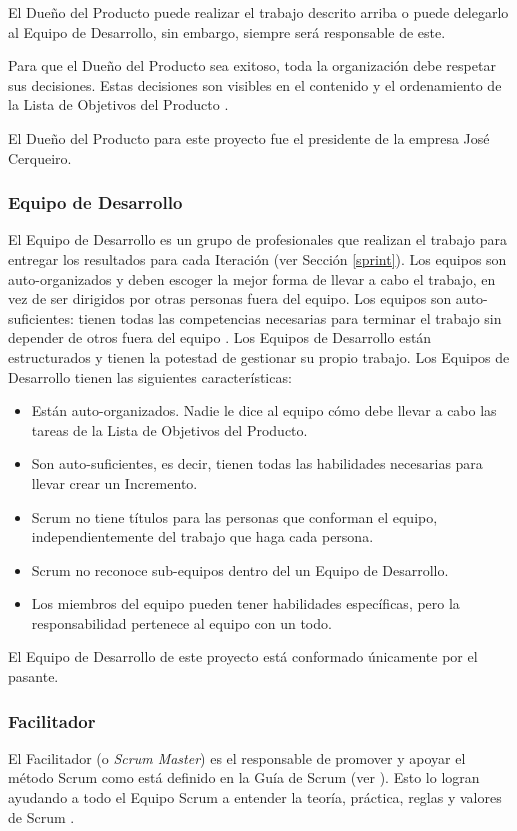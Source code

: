 El Dueño del Producto puede realizar el trabajo descrito arriba o puede delegarlo al Equipo de Desarrollo, sin embargo, siempre será responsable de este.

Para que el Dueño del Producto sea exitoso, toda la organización debe respetar sus decisiones. Estas decisiones son visibles en el contenido y el ordenamiento de la Lista de Objetivos del Producto \cite{scrumSchwaber}.

El Dueño del Producto para este proyecto fue el presidente de la empresa José Cerqueiro.

\subsubsection{Equipo de Desarrollo} \label{developmentTeam}
El Equipo de Desarrollo es un grupo de profesionales que realizan el trabajo para entregar los resultados para cada Iteración (ver Sección \ref{sprint}). Los equipos son auto-organizados y deben escoger la mejor forma de llevar a cabo el trabajo, en vez de ser dirigidos por otras personas fuera del equipo. Los equipos son auto-suficientes: tienen todas las competencias necesarias para terminar el trabajo sin depender de otros fuera del equipo \cite{scrumSchwaber}. Los Equipos de Desarrollo están estructurados y tienen la potestad de gestionar su propio trabajo. Los Equipos de Desarrollo tienen las siguientes características:

\begin{itemize}
    \item Están auto-organizados. Nadie le dice al equipo cómo debe llevar a cabo las tareas de la Lista de Objetivos del Producto.
    \item Son auto-suficientes, es decir, tienen todas las habilidades necesarias para llevar crear un Incremento.
    \item Scrum no tiene títulos para las personas que conforman el equipo, independientemente del trabajo que haga cada persona.
    \item Scrum no reconoce sub-equipos dentro del un Equipo de Desarrollo.
    \item Los miembros del equipo pueden tener habilidades específicas, pero la responsabilidad pertenece al equipo con un todo. \cite{scrumSchwaber}
\end{itemize}

El Equipo de Desarrollo de este proyecto está conformado únicamente por el pasante.

\subsubsection{Facilitador} \label{scrumMaster}
El Facilitador (o \emph{Scrum Master}) es el responsable de promover y apoyar el método Scrum como está definido en la Guía de Scrum (ver \cite{scrumSchwaber}). Esto lo logran ayudando a todo el Equipo Scrum a entender la teoría, práctica, reglas y valores de Scrum \cite{scrumSchwaber}.

